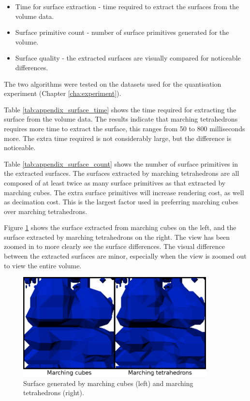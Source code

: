 \begin{itemize}

  \item Time for surface extraction - time required to extract the surfaces
  from the volume data.

  \item Surface primitive count - number of surface primitives generated for
  the volume.

  \item Surface quality - the extracted surfaces are visually compared for
  noticeable differences.

\end{itemize}

The two algorithms were tested on the datasets used for the quantisation
experiment (Chapter \ref{cha:experiment}).

Table \ref{tab:appendix_surface_time} shows the time required for extracting
the surface from the volume data. The results indicate that marching
tetrahedrons requires more time to extract the surface, this ranges from 50 to
800 milliseconds more. The extra time required is not considerably large, but
the difference is noticeable.

Table \ref{tab:appendix_surface_count} shows the number of surface primitives
in the extracted surfaces. The surfaces extracted by marching tetrahedrons are
all composed of at least twice as many surface primitives as that extracted by
marching cubes. The extra surface primitives will increase rendering cost, as
well as decimation cost. This is the largest factor used in preferring marching
cubes over marching tetrahedrons.

Figure \ref{fig:implementation_compare} shows the surface extracted from
marching cubes on the left, and the surface extracted by marching tetrahedrons
on the right. The view has been zoomed in to more clearly see the surface
differences. The visual difference between the extracted surfaces are minor,
especially when the view is zoomed out to view the entire volume.

\begin{figure}
  \begin{center}
    \includegraphics[width=100mm]{surface_compare}
  \end{center}
  \caption{Surface generated by marching cubes (left) and marching tetrahedrons
  (right).}
  \label{fig:implementation_compare}
\end{figure}

